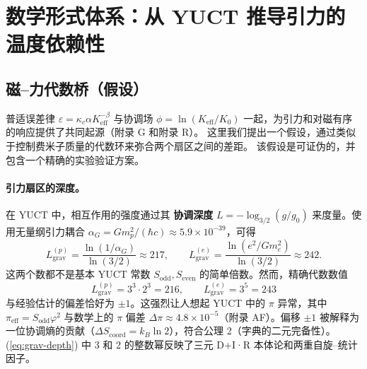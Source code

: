 \documentclass[12pt]{article}
\theoremstyle{remark}
\newcommand{\Keff}{K_{\mathrm{eff}}}
\newcommand{\kappac}{\kappa_c}
\begin{document}
	\section{数学形式体系：从 YUCT 推导引力的温度依赖性}
	\label{sec:math}
	
	\subsection{磁–力代数桥（假设）}
	\label{subsec:magnetism-bridge}
	
	普适误差律 $\varepsilon = \kappac \alpha \Keff^{-\beta}$ 与协调场 $\phi = \ln(\Keff/K_0)$ 一起，为引力和对磁有序的响应提供了共同起源（附录 G 和附录 R）。
	这里我们提出一个假设，通过类似于控制费米子质量的代数环来弥合两个扇区之间的差距。
	该假设是可证伪的，并包含一个精确的实验验证方案。
	
	\paragraph{引力扇区的深度。}
	在 YUCT 中，相互作用的强度通过其 \textbf{协调深度} $L = -\log_{3/2}(g/g_0)$ 来度量。使用无量纲引力耦合 $\alpha_G = G m_p^2/(\hbar c) \approx 5.9\times10^{-39}$，可得
	\begin{equation}
		L_{\mathrm{grav}}^{(p)} = \frac{\ln(1/\alpha_G)}{\ln(3/2)} \approx 217,
		\qquad
		L_{\mathrm{grav}}^{(e)} = \frac{\ln(e^2/G m_e^2)}{\ln(3/2)} \approx 242.
	\end{equation}
	这两个数都不是基本 YUCT 常数 $S_{\mathrm{odd}}, S_{\mathrm{even}}$ 的简单倍数。然而，精确代数数值
	\begin{equation}
		\boxed{L_{\mathrm{grav}}^{(p)} = 3^3 \cdot 2^3 = 216},
		\qquad
		\boxed{L_{\mathrm{grav}}^{(e)} = 3^5 = 243}
		\label{eq:grav-depth}
	\end{equation}
	与经验估计的偏差恰好为 $\pm1$。这强烈让人想起 YUCT 中的 $\pi$ 异常，其中 $\pi_{\mathrm{eff}} = S_{\mathrm{odd}}\varphi^2$ 与数学上的 $\pi$ 偏差 $\Delta\pi \approx 4.8\times10^{-5}$（附录 AF）。偏移 $\pm1$ 被解释为一位协调熵的贡献（$\Delta S_{\mathrm{coord}} = k_B \ln 2$），符合公理 2（字典的二元完备性）。(\ref{eq:grav-depth}) 中 3 和 2 的整数幂反映了三元 D+I·R 本体论和两重自旋–统计因子。
	
\end{document}
